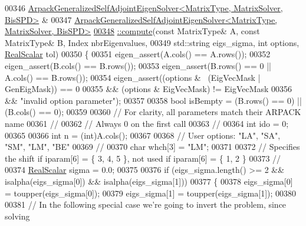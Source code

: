 \begin{DoxyCode}
00346 \hyperlink{class_eigen_1_1_arpack_generalized_self_adjoint_eigen_solver}{ArpackGeneralizedSelfAdjointEigenSolver<MatrixType, MatrixSolver, BisSPD>}
      &
00347     \hyperlink{class_eigen_1_1_arpack_generalized_self_adjoint_eigen_solver_a1a905e5e65e82e559a2cc394a9f42385}{ArpackGeneralizedSelfAdjointEigenSolver<MatrixType, MatrixSolver, BisSPD>}
\hyperlink{class_eigen_1_1_arpack_generalized_self_adjoint_eigen_solver_a1a905e5e65e82e559a2cc394a9f42385}{00348} \hyperlink{class_eigen_1_1_arpack_generalized_self_adjoint_eigen_solver_a1a905e5e65e82e559a2cc394a9f42385}{::compute}(\textcolor{keyword}{const} MatrixType& A, \textcolor{keyword}{const} MatrixType& B, Index nbrEigenvalues,
00349           std::string eigs\_sigma, \textcolor{keywordtype}{int} options, \hyperlink{class_eigen_1_1_arpack_generalized_self_adjoint_eigen_solver_a2555af55e53bf9de894a49e639be2e1e}{RealScalar} tol)
00350 \{
00351   eigen\_assert(A.cols() == A.rows());
00352   eigen\_assert(B.cols() == B.rows());
00353   eigen\_assert(B.rows() == 0 || A.cols() == B.rows());
00354   eigen\_assert((options &~ (EigVecMask | GenEigMask)) == 0
00355             && (options & EigVecMask) != EigVecMask
00356             && \textcolor{stringliteral}{"invalid option parameter"});
00357 
00358   \textcolor{keywordtype}{bool} isBempty = (B.rows() == 0) || (B.cols() == 0);
00359 
00360   \textcolor{comment}{// For clarity, all parameters match their ARPACK name}
00361   \textcolor{comment}{//}
00362   \textcolor{comment}{// Always 0 on the first call}
00363   \textcolor{comment}{//}
00364   \textcolor{keywordtype}{int} ido = 0;
00365 
00366   \textcolor{keywordtype}{int} n = (int)A.cols();
00367 
00368   \textcolor{comment}{// User options: "LA", "SA", "SM", "LM", "BE"}
00369   \textcolor{comment}{//}
00370   \textcolor{keywordtype}{char} whch[3] = \textcolor{stringliteral}{"LM"};
00371     
00372   \textcolor{comment}{// Specifies the shift if iparam[6] = \{ 3, 4, 5 \}, not used if iparam[6] = \{ 1, 2 \}}
00373   \textcolor{comment}{//}
00374   \hyperlink{class_eigen_1_1_arpack_generalized_self_adjoint_eigen_solver_a2555af55e53bf9de894a49e639be2e1e}{RealScalar} sigma = 0.0;
00375 
00376   \textcolor{keywordflow}{if} (eigs\_sigma.length() >= 2 && isalpha(eigs\_sigma[0]) && isalpha(eigs\_sigma[1]))
00377   \{
00378       eigs\_sigma[0] = toupper(eigs\_sigma[0]);
00379       eigs\_sigma[1] = toupper(eigs\_sigma[1]);
00380 
00381       \textcolor{comment}{// In the following special case we're going to invert the problem, since solving}

\end{DoxyCode}
